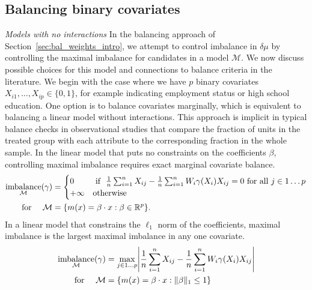 \documentclass{article}
\newcommand{\subsubsection}[1]{\par\noindent\textit{#1}\enspace}
\DeclarePairedDelimiter\norm{\lVert}{\rVert}
\DeclarePairedDelimiter\abs{\lvert}{\rvert}
\DeclarePairedDelimiter\set{\{}{\}}
\theoremstyle{definition}
\newcommand{\R}{\ensuremath{\mathbb{R}}}
\newcommand{\dm}{\delta \mu}
\DeclareMathOperator{\imbalance}{imbalance}
\newcommand{\model}{\mathcal{M}}
\newcommand{\<}{\langle}
\renewcommand{\>}{\rangle}
\begin{document}
\vspace{-.3cm}
\subsection{Balancing binary covariates}
\label{sec:balancing-binary}

\subsubsection{Models with no interactions}
\label{sec_balancing_marginally}
In the balancing approach of Section~\ref{sec:bal_weights_intro},
we attempt to control imbalance in $\dm$ by
controlling the maximal imbalance
for candidates in a model $\model$.
We now discuss possible choices for this model and connections to balance criteria in the literature. We begin with the case where we have $p$ binary covariates $X_{i1},\ldots,X_{ip} \in \{0,1\}$, for example indicating employment status or high school education. One option is to  balance covariates marginally,
which is equivalent to balancing a linear model without interactions.
This approach is implicit in typical balance checks in observational studies that compare the fraction of units in the treated group with each attribute to the corresponding fraction in the whole sample. In the linear model that puts no
constraints on the coefficients $\beta$, controlling maximal imbalance requires exact marginal covariate balance.
\begin{equation}
\begin{aligned}
\imbalance_{\model}(\gamma) &= \begin{cases} 0 & \text{ if } \ \frac{1}{n}\sum_{i=1}^n X_{ij} - \frac{1}{n}\sum_{i=1}^n W_i\gamma(X_i) X_{ij}  = 0
\text{ for all } j \in 1 \ldots p \\
+\infty & \text{otherwise}
\end{cases} \\
\text{ for }\quad \model &= \set*{ m(x) = \beta \cdot x : \beta \in \R^p }.
\end{aligned}
\end{equation}
In a linear model that constrains the $\ell_1$ norm of the coefficients,  maximal imbalance is the largest maximal imbalance in any one covariate.
\begin{equation}
    \label{eq:imbalance_margin_cat}
    \begin{aligned}
   \imbalance_{\model}(\gamma) &= \max_{j \in 1 \ldots p} \abs*{\frac{1}{n}\sum_{i=1}^n X_{ij} - \frac{1}{n}\sum_{i=1}^n W_i\gamma(X_i) X_{ij} }  \\
   \text{ for }\quad \model &= \set*{ m(x) = \beta \cdot x : \norm{\beta}_1 \le 1 } \\
\end{aligned}
\end{equation}
\end{document}
